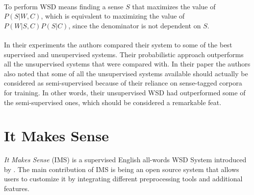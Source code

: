 \paragraph{}
To perform WSD means finding a sense $S$ that maximizes the value of $P(S|W,C)$, which is equivalent to maximizing the value of $P(W|S,C)P(S|C)$, since the denominator is not dependent on $S$.


\paragraph{}
In their experiments the authors compared their system to some of the best supervised and unsupervised systems. Their probabilistic approach outperforms all the unsupervised systems that were compared with. In their paper the authors also noted that some of all the unsupervised systems available should actually be considered as semi-supervised because of their reliance on sense-tagged corpora for training. In other words, their unsupervised WSD had outperformed some of the semi-supervised ones, which should be considered a remarkable feat.

\section{It Makes Sense}
\paragraph{}
\textit{It Makes Sense} (IMS) is a supervised English all-words WSD System introduced by \cite{itmakessense}. The main contribution of IMS is being an open source system that allows users to customize it by integrating different preprocessing tools and additional features.

